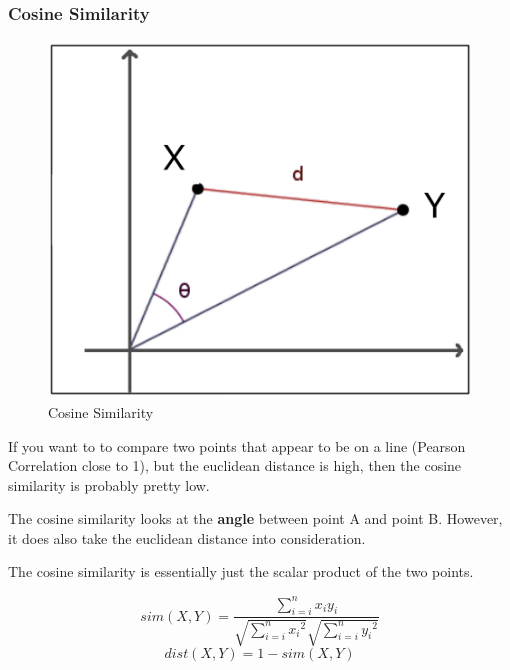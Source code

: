 \documentclass[11pt]{article}
\begin{document}
\subsubsection{Cosine Similarity}

\begin{figure}
    \centering
    \includegraphics[keepaspectratio=true,height=14\baselineskip]{cosine_similarity.png}
    \caption{Cosine Similarity}
    \label{fig:cosine_similarity}
\end{figure}

If you want to to compare two points that appear to be on a line (Pearson Correlation close to 1), but the euclidean distance is high, then the cosine similarity is probably pretty low.

The cosine similarity looks at the \textbf{angle} between point A and point B. However, it does also take the euclidean distance into consideration.

\vspace{10px}

The cosine similarity is essentially just the scalar product of the two points.

\vspace{10px}

\begin{equation} \label{eq:sim}
    sim(X,Y) = \frac{\sum^{n}_{i=i}{x_{i} y_{i}}}{\sqrt{\sum^{n}_{i=i}{x_{i}}^2}\sqrt{\sum^{n}_{i=i}{y_{i}}^2}}
\end{equation}
\begin{equation}
    dist(X,Y) = 1 - sim(X,Y)
\end{equation}
\end{document}
